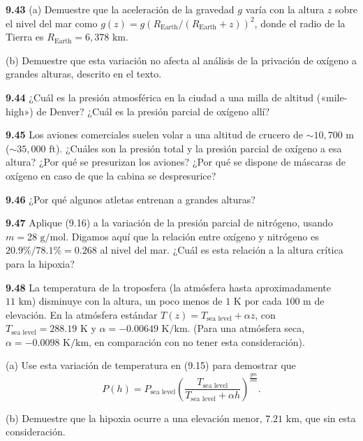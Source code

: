 \documentclass[12pt]{book}
\begin{document}
\noindent \textbf{9.43} (a) Demuestre que la aceleración de la gravedad $g$ varía con la altura $z$ sobre el nivel del mar como $g(z) = g (R_{\text{Earth}}/(R_{\text{Earth}} + z))^2$, donde el radio de la Tierra es $R_{\text{Earth}} = 6{,}378\text{ km}$.
\par\noindent (b) Demuestre que esta variación no afecta al análisis de la privación de oxígeno a grandes alturas, descrito en el texto.

\noindent \textbf{9.44} ¿Cuál es la presión atmosférica en la ciudad a una milla de altitud («mile-high») de Denver? ¿Cuál es la presión parcial de oxígeno allí?

\noindent \textbf{9.45} Los aviones comerciales suelen volar a una altitud de crucero de $\sim 10{,}700\text{ m}$ ($\sim 35{,}000\text{ ft}$). ¿Cuáles son la presión total y la presión parcial de oxígeno a esa altura? ¿Por qué se presurizan los aviones? ¿Por qué se dispone de máscaras de oxígeno en caso de que la cabina se despresurice?

\noindent \textbf{9.46} ¿Por qué algunos atletas entrenan a grandes alturas?

\noindent \textbf{9.47} Aplique (9.16) a la variación de la presión parcial de nitrógeno, usando $m = 28\text{ g/mol}$. Digamos aquí que la relación entre oxígeno y nitrógeno es $20.9\%/78.1\% = 0.268$ al nivel del mar. ¿Cuál es esta relación a la altura crítica para la hipoxia?

\noindent \textbf{9.48} La temperatura de la troposfera (la atmósfera hasta aproximadamente $11\text{ km}$) disminuye con la altura, un poco menos de $1\text{ K}$ por cada $100\text{ m}$ de elevación. En la atmósfera estándar $T(z) = T_{\text{sea level}} + \alpha z$, con $T_{\text{sea level}} = 288.19\text{ K}$ y $\alpha = -0.00649\text{ K/km}$. (Para una atmósfera seca, $\alpha = -0.0098\text{ K/km}$, en comparación con no tener esta consideración).
\par\noindent (a) Use esta variación de temperatura en (9.15) para demostrar que
\begin{equation}
P(h) = P_{\text{sea level}} \left( \frac{T_{\text{sea level}}}{T_{\text{sea level}} + \alpha h} \right)^{\frac{gm}{R\alpha}}. \label{eq:9.21}
\end{equation}
\par\noindent (b) Demuestre que la hipoxia ocurre a una elevación menor, $7.21\text{ km}$, que sin esta consideración.
\end{document}
